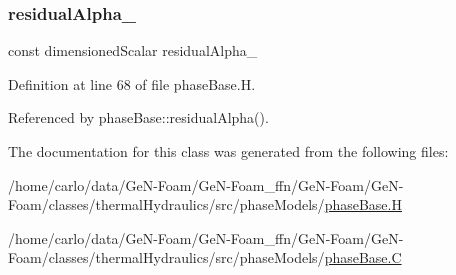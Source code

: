 \mbox{\label{classFoam_1_1phaseBase_a80e4b957331ddeaf1ebe3d8a825cf24d}} 
\subsubsection{\texorpdfstring{residual\+Alpha\+\_\+}{residualAlpha\_}}
{\footnotesize\ttfamily const dimensioned\+Scalar residual\+Alpha\+\_\+\hspace{0.3cm}{\ttfamily [protected]}}



Definition at line 68 of file phase\+Base.\+H.



Referenced by phase\+Base\+::residual\+Alpha().



The documentation for this class was generated from the following files\+:\begin{DoxyCompactItemize}
\item 
/home/carlo/data/\+Ge\+N-\/\+Foam/\+Ge\+N-\/\+Foam\+\_\+ffn/\+Ge\+N-\/\+Foam/\+Ge\+N-\/\+Foam/classes/thermal\+Hydraulics/src/phase\+Models/\hyperlink{phaseBase_8H}{phase\+Base.\+H}\item 
/home/carlo/data/\+Ge\+N-\/\+Foam/\+Ge\+N-\/\+Foam\+\_\+ffn/\+Ge\+N-\/\+Foam/\+Ge\+N-\/\+Foam/classes/thermal\+Hydraulics/src/phase\+Models/\hyperlink{phaseBase_8C}{phase\+Base.\+C}\end{DoxyCompactItemize}

